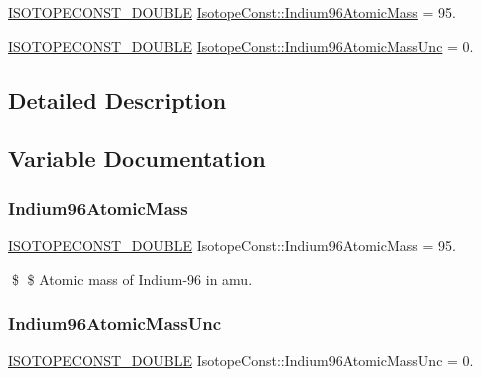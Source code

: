 \begin{DoxyCompactItemize}
\item 
\mbox{\hyperlink{group___isotope_const-_macros_ga8f45a7272ce02c0b4c65c44636ed719a}{I\+S\+O\+T\+O\+P\+E\+C\+O\+N\+S\+T\+\_\+\+D\+O\+U\+B\+LE}} \mbox{\hyperlink{group___isotope_const-_indium-_in96_ga936a1dc0ca9d27cb797f1de5f0153a7c}{Isotope\+Const\+::\+Indium96\+Atomic\+Mass}} = 95.
\item 
\mbox{\hyperlink{group___isotope_const-_macros_ga8f45a7272ce02c0b4c65c44636ed719a}{I\+S\+O\+T\+O\+P\+E\+C\+O\+N\+S\+T\+\_\+\+D\+O\+U\+B\+LE}} \mbox{\hyperlink{group___isotope_const-_indium-_in96_ga852903d53c4fcaa5e914b7449a2c28cc}{Isotope\+Const\+::\+Indium96\+Atomic\+Mass\+Unc}} = 0.
\end{DoxyCompactItemize}


\subsection{Detailed Description}


\subsection{Variable Documentation}
\mbox{\label{group___isotope_const-_indium-_in96_ga936a1dc0ca9d27cb797f1de5f0153a7c}} 
\subsubsection{\texorpdfstring{Indium96\+Atomic\+Mass}{Indium96AtomicMass}}
{\footnotesize\ttfamily \mbox{\hyperlink{group___isotope_const-_macros_ga8f45a7272ce02c0b4c65c44636ed719a}{I\+S\+O\+T\+O\+P\+E\+C\+O\+N\+S\+T\+\_\+\+D\+O\+U\+B\+LE}} Isotope\+Const\+::\+Indium96\+Atomic\+Mass = 95.}

\$ \$ Atomic mass of Indium-\/96 in amu. \mbox{\label{group___isotope_const-_indium-_in96_ga852903d53c4fcaa5e914b7449a2c28cc}} 
\subsubsection{\texorpdfstring{Indium96\+Atomic\+Mass\+Unc}{Indium96AtomicMassUnc}}
{\footnotesize\ttfamily \mbox{\hyperlink{group___isotope_const-_macros_ga8f45a7272ce02c0b4c65c44636ed719a}{I\+S\+O\+T\+O\+P\+E\+C\+O\+N\+S\+T\+\_\+\+D\+O\+U\+B\+LE}} Isotope\+Const\+::\+Indium96\+Atomic\+Mass\+Unc = 0.}

